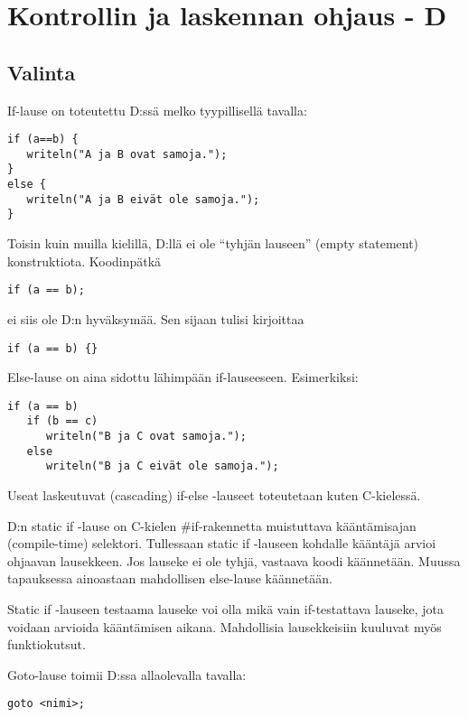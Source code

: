 \documentclass[11pt,oneside,a4paper]{article}
\begin{document}
\section{Kontrollin ja laskennan ohjaus - D}

\subsection{Valinta}

If-lause on toteutettu D:ssä melko tyypillisellä tavalla:

\begin{verbatim}
if (a==b) {
   writeln("A ja B ovat samoja.");
}
else {
   writeln("A ja B eivät ole samoja.");
}
\end{verbatim}

Toisin kuin muilla kielillä, D:llä ei ole ``tyhjän lauseen'' (empty statement)
konstruktiota. Koodinpätkä

\begin{verbatim}
if (a == b);
\end{verbatim}

ei siis ole D:n hyväksymää. Sen sijaan tulisi kirjoittaa

\begin{verbatim}
if (a == b) {}
\end{verbatim}

Else-lause on aina sidottu lähimpään if-lauseeseen. Esimerkiksi:

\begin{verbatim}
if (a == b)
   if (b == c)
      writeln("B ja C ovat samoja.");
   else
      writeln("B ja C eivät ole samoja.");
\end{verbatim}

Useat laskeutuvat (cascading) if-else -lauseet toteutetaan kuten C-kielessä.


D:n static if -lause on C-kielen \#if-rakennetta muistuttava kääntämisajan
(compile-time) selektori. Tullessaan static if -lauseen kohdalle kääntäjä arvioi
ohjaavan lausekkeen. Jos lauseke ei ole tyhjä, vastaava koodi käännetään. Muussa
tapauksessa ainoastaan mahdollisen else-lause käännetään. 

Static if -lauseen testaama lauseke voi olla mikä vain if-testattava lauseke,
jota voidaan arvioida kääntämisen aikana. Mahdollisia lausekkeisiin kuuluvat
myös funktiokutsut.

Goto-lause toimii D:ssa allaolevalla tavalla:

\begin{verbatim}
goto <nimi>;
\end{verbatim}
\end{document}
